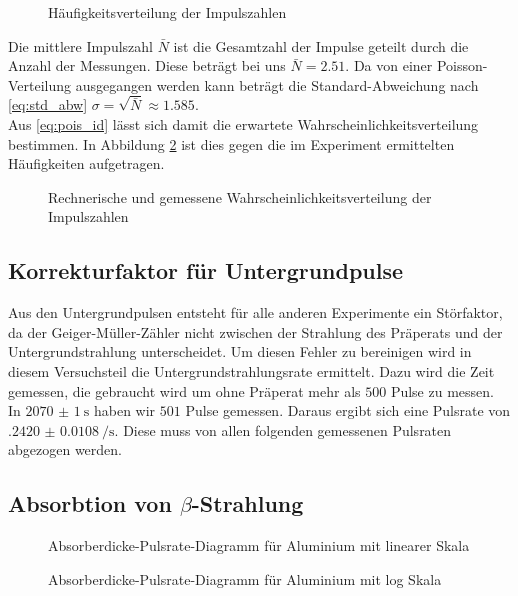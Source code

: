 \begin{figure}[h!]
	\centering
	
	\caption{Häufigkeitsverteilung der Impulszahlen}
	\label{fig:haeuf_hint_1}
\end{figure}

Die mittlere Impulszahl $ \bar N $ ist die Gesamtzahl der Impulse geteilt durch die Anzahl der Messungen. Diese beträgt bei uns $ \bar N = \num{2.51} $. Da von einer Poisson-Verteilung ausgegangen werden kann beträgt die Standard-Abweichung nach \eqref{eq:std_abw} $ \sigma = \sqrt{\bar N} \approx \num{1.585} $.\\
Aus \eqref{eq:pois_id} lässt sich damit die erwartete Wahrscheinlichkeitsverteilung bestimmen. In Abbildung \ref{fig:a2_rech} ist dies gegen die im Experiment ermittelten Häufigkeiten aufgetragen.

\begin{figure}[h!]
\centering

\caption{Rechnerische und gemessene Wahrscheinlichkeitsverteilung der Impulszahlen}
\label{fig:a2_rech}
\end{figure}

\subsection{Korrekturfaktor für Untergrundpulse}
Aus den Untergrundpulsen entsteht für alle anderen Experimente ein Störfaktor, da der Geiger-Müller-Zähler nicht zwischen der Strahlung des Präperats und der Untergrundstrahlung unterscheidet. Um diesen Fehler zu bereinigen wird in diesem Versuchsteil die Untergrundstrahlungsrate ermittelt. Dazu wird die Zeit gemessen, die gebraucht wird um ohne Präperat mehr als $ 500 $ Pulse zu messen.\\
In $ \SI{2070(1)}{\second} $ haben wir $ 501 $ Pulse gemessen. Daraus ergibt sich eine Pulsrate von $ \SI{.2420(108)}{\per\second} $. Diese muss von allen folgenden gemessenen Pulsraten abgezogen werden.

\subsection{Absorbtion von $ \beta $-Strahlung}

\begin{figure}
\centering

\caption{Absorberdicke-Pulsrate-Diagramm für Aluminium mit linearer Skala}
\end{figure}

\begin{figure}
\centering

\caption{Absorberdicke-Pulsrate-Diagramm für Aluminium mit log Skala}
\end{figure}